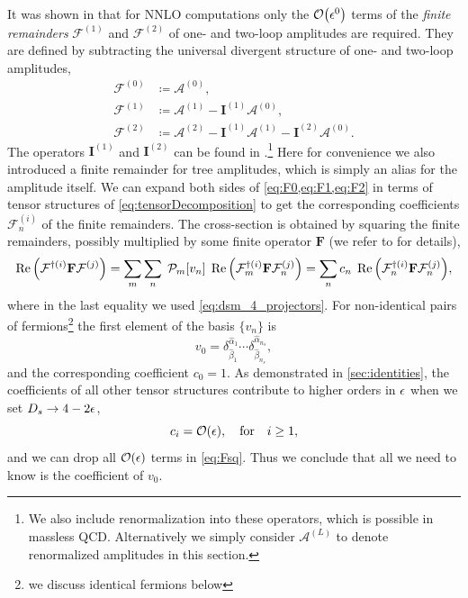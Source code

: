 It was shown in \cite{Weinzierl:2011uz} that for NNLO computations only the $\order{\eps^0}$ terms of the 
\emph{finite remainders} $\mathcal{F}^{(1)}$ and $\mathcal{F}^{(2)}$ of one- and two-loop amplitudes are required.
They are defined by subtracting the universal divergent structure of one- and two-loop amplitudes, 
\begin{subequations}
  \begin{align}
    \label{eq:F0}
    \mathcal{F}^{(0)} &\coloneqq \mathcal{A}^{(0)}, \\ 
     \label{eq:F1}
    \mathcal{F}^{(1)} &\coloneqq \mathcal{A}^{(1)} - \mathbf{I}^{(1)} \mathcal{A}^{(0)}, \\ 
     \label{eq:F2}
    \mathcal{F}^{(2)} &\coloneqq \mathcal{A}^{(2)}  - \mathbf{I}^{(1)} \mathcal{A}^{(1)} - \mathbf{I}^{(2)} \mathcal{A}^{(0)}.
  \end{align}
\end{subequations}
The operators $\mathbf{I}^{(1)}$ and $\mathbf{I}^{(2)}$ can be found in \cite{Catani:1998bh,Sterman:2002qn,Becher:2009cu,Gardi:2009qi}.\footnote{
  We also include renormalization into these operators, which is possible in massless QCD.
  Alternatively we simply consider $\mathcal{A}^{(L)}$ to denote renormalized amplitudes in this section.
}
Here for convenience we also introduced a finite remainder for tree amplitudes, which is simply an alias for the amplitude itself.
We can expand both sides of \cref{eq:F0,eq:F1,eq:F2} in terms of tensor structures of \cref{eq:tensorDecomposition}
to get the corresponding coefficients $\mathcal{F}^{(i)}_n$ of the finite remainders.
The cross-section is obtained by squaring the finite remainders, possibly multiplied by some
finite operator $\mathbf{F}$ (we refer to \cite{Weinzierl:2011uz} for details),
\begin{equation} \label{eq:Fsq}
  \Re\qty(\mathcal{F}^{\dagger(i)}\mathbf{F}\mathcal{F}^{(j)}) = \sum_m\sum_n\; \mathcal{P}_m \qty[v_n]  \; \Re\qty(\mathcal{F}^{\dagger(i)}_m\mathbf{F}\mathcal{F}^{(j)}_n) = 
     \sum_n c_n \; \Re\qty(\mathcal{F}^{\dagger(i)}_n\mathbf{F}\mathcal{F}^{(j)}_n),
\end{equation}
where in the last equality we used \cref{eq:dsm_4_projectors}.
For non-identical pairs of fermions\footnote{we discuss identical fermions below} 
the first element of the basis $\{v_n\}$ is
\begin{equation}
  v_0  = \delta^{\hat{\alpha}_1}_{\hat{\beta}_1}\cdots \delta^{\hat{\alpha}_{n_s}}_{\hat{\beta}_{n_s}},
\end{equation}
and the corresponding coefficient $c_0 = 1$.
As demonstrated in \cref{sec:identities}, the coefficients of all other tensor structures
contribute to higher orders in $\epsilon$ when we set $D_s\to 4-2\epsilon$,
\begin{equation}
  c_i=\order{\eps}, \qfor i\geq 1,
\end{equation}
and we can drop all $\order{\eps}$ terms in \cref{eq:Fsq}.
Thus we conclude that all we need to know is the coefficient of $v_0$.


